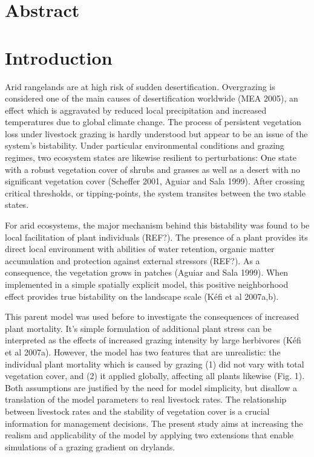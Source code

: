 
\section{Abstract}


\section{Introduction}

Arid rangelands are at high risk of sudden desertification. Overgrazing is considered one of the main causes of desertification worldwide (MEA 2005), an effect which is aggravated by reduced local precipitation and increased temperatures due to global climate change.  The process of persistent vegetation loss under livestock grazing is hardly understood but appear to be  an issue of the system's bistability. Under particular environmental conditions and grazing regimes, two ecosystem states are likewise resilient to perturbations: One state with a robust vegetation cover of shrubs and grasses as well as a desert with no significant vegetation cover (Scheffer 2001, Aguiar and Sala 1999). After crossing critical thresholds, or tipping-points, the system transites between the two stable states.

For arid ecosystems, the major mechanism behind this bistability was found to be local facilitation of plant individuals (REF?). The presence of a plant provides its direct local environment with abilities of water retention, organic matter accumulation and protection against external stressors (REF?). As a consequence, the vegetation grows in patches (Aguiar and Sala 1999).  When implemented in a simple spatially explicit model, this positive neighborhood effect provides true bistability on the landscape scale (K\'efi et al 2007a,b).

This parent model was used before to investigate the consequences of increased plant mortality. It's simple formulation of additional plant stress can be interpreted as the effects of increased grazing intensity by large herbivores (K\'efi et al 2007a). However, the model has two features that are unrealistic: the individual plant mortality which is caused by grazing (1) did not vary with total vegetation cover, and (2) it applied globally, affecting all plants likewise (Fig. 1).
Both assumptions are justified by the need for model simplicity, but disallow a translation of the model parameters to real livestock rates. The relationship between livestock rates and the stability of vegetation cover is a crucial information for management decisions. The present study aims at increasing the realism and applicability of the model by applying two extensions that enable simulations of a grazing gradient on drylands.

